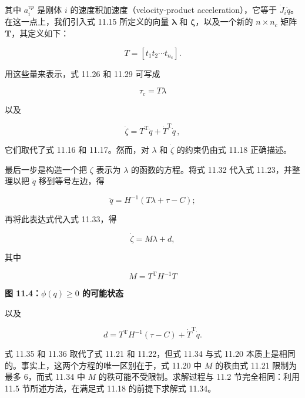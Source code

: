 \documentclass[10pt,a4paper]{book}
\theoremstyle{thmstyle} %
\theoremstyle{defstyle} %
\theoremstyle{prostyle} %
\begin{document}
其中 $a_{i}^{vp}$ 是刚体 $i$ 的速度积加速度（velocity-product acceleration），它等于 $\dot{J}_{i} \dot{q}$。在这一点上，我们引入式 11.15 所定义的向量 $\boldsymbol{\lambda}$ 和 $\boldsymbol{\zeta}$，以及一个新的 $n \times n_{c}$ 矩阵 $\boldsymbol{T}$，其定义如下：



$$
T = \left[ t _ { 1 }  t _ { 2 }  \cdots  t _ { n _ { c } } \right] .
$$



用这些量来表示，式 11.26 和 11.29 可写成



$$
\tau _ { c } = T \lambda
$$



以及



$$
\dot { \zeta } = T ^{\mathrm { T} } \ddot { q } + \dot { T } ^{\mathrm { T} } \dot { q } \, ,
$$



它们取代了式 11.16 和 11.17。然而，对 $\lambda$ 和 $\dot{\zeta}$ 的约束仍由式 11.18 正确描述。



最后一步是构造一个把 $\zeta$ 表示为 $\lambda$ 的函数的方程。将式 11.32 代入式 11.23，并整理以把 $\ddot{q}$ 移到等号左边，得



$$
\ddot { q } = H ^{- 1} ( T \lambda + \tau - C ) ;
$$



再将此表达式代入式 11.33，得



$$
\dot { \zeta } = M \lambda + d ,
$$



其中



$$
M = T ^{\mathrm { T} } H ^{- 1} T
$$



\noindent\textbf{图 11.4：$\phi(q) \geq 0$ 的可能状态}





以及



$$
d = T ^{\mathrm { T} } H ^{- 1} ( \tau - C ) + \dot { T } ^{\mathrm { T} } \dot { q } .
$$



式 11.35 和 11.36 取代了式 11.21 和 11.22，但式 11.34 与式 11.20 本质上是相同的。事实上，这两个方程的唯一区别在于，式 11.20 中 $M$ 的秩由式 11.21 限制为最多 6，而式 11.34 中 $M$ 的秩可能不受限制。求解过程与 11.2 节完全相同：利用 11.5 节所述方法，在满足式 11.18 的前提下求解式 11.34。
\end{document}

